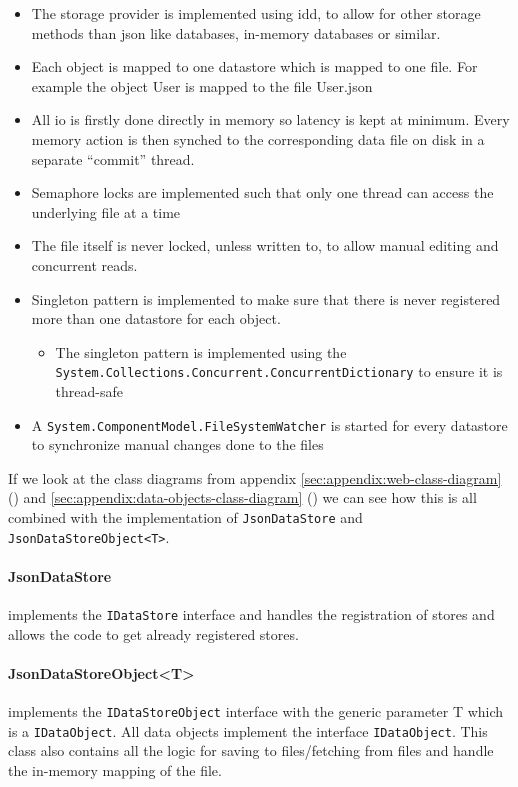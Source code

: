 \documentclass{article}
\begin{document}
\begin{itemize}
    \item The storage provider is implemented using \gls{idd}, to allow for other storage methods than \gls{json} like databases, in-memory databases or similar.
    \item Each object is mapped to one datastore which is mapped to one file. For example the object User is mapped to the file User.json
    \item All \gls{io} is firstly done directly in memory so latency is kept at minimum. Every memory action is then synched to the corresponding data file on disk in a separate \enquote{commit} thread.
    \item Semaphore locks are implemented such that only one thread can access the underlying file at a time
    \item The file itself is never locked, unless written to, to allow manual editing and concurrent reads.
    \item Singleton pattern is implemented to make sure that there is never registered more than one datastore for each object.
    \begin{itemize}
        \item The singleton pattern is implemented using the \texttt{System.Collections.Concurrent.ConcurrentDictionary} to ensure it is thread-safe
    \end{itemize}
    \item A \texttt{System.ComponentModel.FileSystemWatcher} is started for every datastore to synchronize manual changes done to the files
\end{itemize}

If we look at the class diagrams from appendix \ref{sec:appendix:web-class-diagram} () and \ref{sec:appendix:data-objects-class-diagram} () we can see how this is all combined with the implementation of \texttt{JsonDataStore} and \texttt{JsonDataStoreObject<T>}. 

\paragraph{JsonDataStore} implements the \texttt{IDataStore} interface and handles the registration of stores and allows the code to get already registered stores.
\paragraph{JsonDataStoreObject<T>} implements the \texttt{IDataStoreObject} interface with the generic parameter T which is a \texttt{IDataObject}. All data objects implement the interface \texttt{IDataObject}. This class also contains all the logic for saving to files/fetching from files and handle the in-memory mapping of the file.
\end{document}
